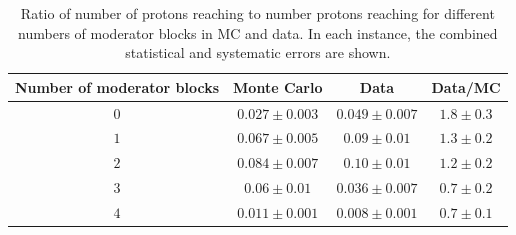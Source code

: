 \begin{figure}[h]
  \begin{adjustbox}{max totalsize=.7\textwidth, center}
    
  \end{adjustbox}
  \caption[]{}
  \label{fig:tofS4Sim}
\end{figure}

\begin{table}
  \centering
  \caption[Comparison of number of protons reaching \SThree and \SFour in data and Monte Carlo]{Ratio of number of protons reaching \SFour to number protons reaching \SThree for different numbers of moderator blocks in MC and data. In each instance, the combined statistical and systematic errors are shown.}
  \begin{tabular}{c|c c c}
    \hline
    \hline
    Number of moderator blocks & Monte Carlo & Data & Data/MC\\
    \hline
    $0$ & $0.027 \pm 0.003$ & $0.049 \pm 0.007$ & $1.8 \pm 0.3$ \\
    $1$ & $0.067 \pm 0.005$ & $0.09 \pm 0.01$ & $1.3 \pm 0.2$ \\
    $2$ & $0.084 \pm 0.007$ & $0.10 \pm 0.01$ & $1.2 \pm 0.2$ \\
    $3$ & $0.06 \pm 0.01$ & $0.036 \pm 0.007$ & $0.7 \pm 0.2$ \\
    $4$ & $0.011 \pm 0.001$ & $0.008 \pm 0.001$ & $0.7 \pm 0.1$ \\
    \hline
  \end{tabular}
  \label{tab:s3s4Ratios}
\end{table}


